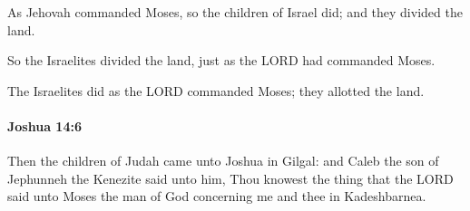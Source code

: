 			\begin{versebox}
					\item[BHS] 
					\item[ASV] As Jehovah commanded Moses, so the children of Israel did; and they divided the land.
					\item[NIV] So the Israelites divided the land, just as the LORD had commanded Moses.
					\item[NRSV] The Israelites did as the LORD commanded Moses; they allotted the land.
			\end{versebox}

		\paragraph{Joshua 14:6} %
			\label{JOSHUA-14-6}

			Then the children of Judah came unto Joshua in Gilgal: and Caleb the son of Jephunneh the Kenezite said unto him, Thou knowest the thing that the LORD said unto Moses the man of God concerning me and thee in Kadeshbarnea.

